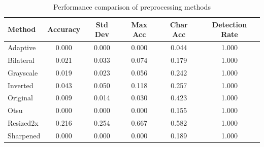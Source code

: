\begin{table}[htbp]
\centering
\caption{Performance comparison of preprocessing methods}
\label{tab:method_performance}
\begin{tabular}{lccccc}
\hline
Method & Accuracy & Std Dev & Max Acc & Char Acc & Detection Rate \\
\hline
Adaptive & 0.000 & 0.000 & 0.000 & 0.044 & 1.000 \\
Bilateral & 0.021 & 0.033 & 0.074 & 0.179 & 1.000 \\
Grayscale & 0.019 & 0.023 & 0.056 & 0.242 & 1.000 \\
Inverted & 0.043 & 0.050 & 0.118 & 0.257 & 1.000 \\
Original & 0.009 & 0.014 & 0.030 & 0.423 & 1.000 \\
Otsu & 0.000 & 0.000 & 0.000 & 0.155 & 1.000 \\
Resized2x & 0.216 & 0.254 & 0.667 & 0.582 & 1.000 \\
Sharpened & 0.000 & 0.000 & 0.000 & 0.189 & 1.000 \\
\hline
\end{tabular}
\end{table}
